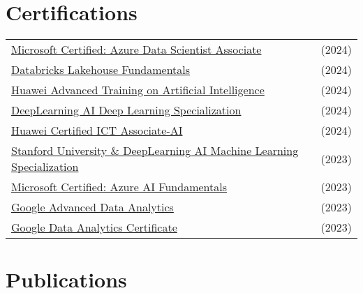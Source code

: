 \documentclass[a4paper,10pt]{article}
\begin{document}
\section{Certifications}
\begin{tabularx}{\linewidth}{@{}l X@{}}	
\href{https://balcortex.github.io/assets/certifications/microsoft_azure_data_scientist_associate.pdf}{Microsoft Certified: Azure Data Scientist Associate} & \hfill (2024) \\
\href{https://balcortex.github.io/assets/certifications/databricks_lakehouse_fundamentals.pdf}{Databricks Lakehouse Fundamentals} & \hfill (2024) \\
\href{https://balcortex.github.io/assets/certifications/huawei_ia_1000_certificate.pdf}{Huawei Advanced Training on Artificial Intelligence} & \hfill (2024) \\
\href{https://balcortex.github.io/assets/certifications/coursera_deep_learning.pdf}{DeepLearning AI Deep Learning Specialization} & \hfill (2024) \\
\href{https://balcortex.github.io/assets/certifications/huawei_certification.pdf}{Huawei Certified ICT Associate-AI} & \hfill (2024) \\
\href{https://balcortex.github.io/assets/certifications/coursera_machine_learning.pdf}{Stanford University \& DeepLearning AI Machine Learning Specialization} & \hfill (2023) \\
\href{https://balcortex.github.io/assets/certifications/microsoft_azure_ai_fundamentals.pdf}{Microsoft Certified: Azure AI Fundamentals} & \hfill (2023) \\
\href{https://balcortex.github.io/assets/certifications/coursera_google_advanced_data_analytics.pdf}{Google Advanced Data Analytics} & \hfill (2023) \\
\href{https://balcortex.github.io/assets/certifications/coursera_google_data_analytics.pdf}{Google Data Analytics Certificate} & \hfill (2023) \\
\end{tabularx}


\section{Publications}
\begin{refsection}
\nocite{*}
\printbibliography[heading=none]
\end{refsection}



\vfill
{}
\end{document}
